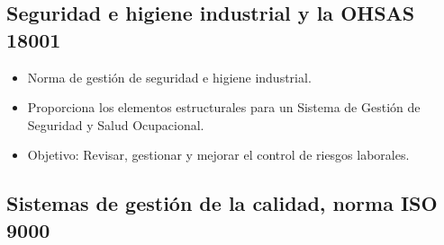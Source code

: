 \documentclass{article} %
\begin{document}
\subsection{Seguridad e higiene industrial y la OHSAS 18001}

\begin{itemize}[label={},left=0pt,align=parleft]
    \item \begin{highlightbox}[levelone] Norma de gestión de seguridad e higiene industrial. \end{highlightbox}
    \item \begin{highlightbox}[levelone] Proporciona los elementos estructurales para un Sistema de Gestión de Seguridad y Salud Ocupacional. \end{highlightbox}
    \item \begin{highlightbox}[levelone] Objetivo: Revisar, gestionar y mejorar el control de riesgos laborales. \end{highlightbox}
\end{itemize}

\subsection{Sistemas de gestión de la calidad, norma ISO 9000}
\end{document}
